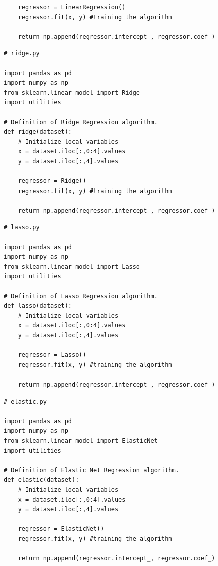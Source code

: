\documentclass[letterpaper]{article} %
\begin{document}
{\begin{verbatim}
    regressor = LinearRegression()
    regressor.fit(x, y) #training the algorithm

    return np.append(regressor.intercept_, regressor.coef_)
\end{verbatim}
\bigskip
\begin{verbatim}
# ridge.py

import pandas as pd
import numpy as np
from sklearn.linear_model import Ridge
import utilities

# Definition of Ridge Regression algorithm.
def ridge(dataset):
    # Initialize local variables
    x = dataset.iloc[:,0:4].values
    y = dataset.iloc[:,4].values

    regressor = Ridge()
    regressor.fit(x, y) #training the algorithm

    return np.append(regressor.intercept_, regressor.coef_)
\end{verbatim}
\bigskip
\begin{verbatim}
# lasso.py

import pandas as pd
import numpy as np
from sklearn.linear_model import Lasso
import utilities

# Definition of Lasso Regression algorithm.
def lasso(dataset):
    # Initialize local variables
    x = dataset.iloc[:,0:4].values
    y = dataset.iloc[:,4].values

    regressor = Lasso()
    regressor.fit(x, y) #training the algorithm

    return np.append(regressor.intercept_, regressor.coef_)
\end{verbatim}
\bigskip
\begin{verbatim}
# elastic.py

import pandas as pd
import numpy as np
from sklearn.linear_model import ElasticNet
import utilities

# Definition of Elastic Net Regression algorithm.
def elastic(dataset):
    # Initialize local variables
    x = dataset.iloc[:,0:4].values
    y = dataset.iloc[:,4].values

    regressor = ElasticNet()
    regressor.fit(x, y) #training the algorithm

    return np.append(regressor.intercept_, regressor.coef_)
\end{verbatim}
}
\end{document}
